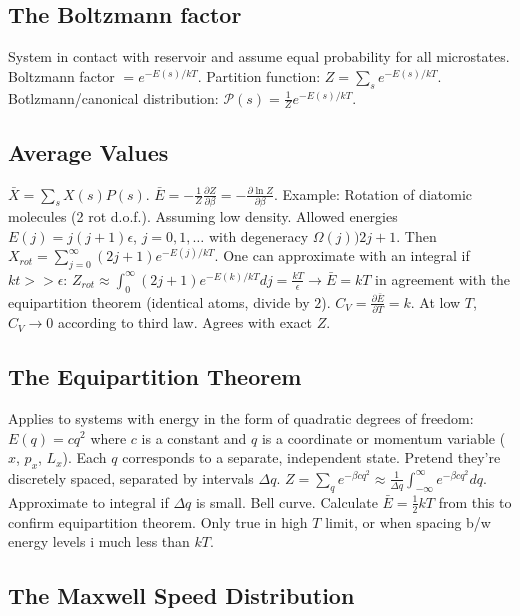 \documentclass[11pt,twocolumn]{amsart}
\begin{document}
\subsection{The Boltzmann factor}
System in contact with reservoir and assume equal probability for all microstates. Boltzmann factor $=e^{-E(s)/kT}$. Partition function: $Z = \sum_s e^{-E(s)/kT}$. Botlzmann/canonical distribution: $\mathcal{P}(s) = \frac{1}{Z}e^{-E(s)/kT}$.

\subsection{Average Values}
$\bar{X} = \sum_s X(s) P(s)$. $\bar{E} = -\frac{1}{Z} \frac{\partial Z}{\partial \beta} = -\frac{\partial \ln Z}{\partial \beta}$. Example: Rotation of diatomic molecules (2 rot d.o.f.). Assuming low density. Allowed energies $E(j) = j(j +1)\epsilon$, $j=0,1,\dots$ with degeneracy $\Omega(j) ) 2j + 1$. Then $X_{rot} = \sum_{j=0}^\infty (2j+1) e^{-E(j)/kT}$. One can approximate with an integral if $kt >> \epsilon$: $Z_{rot} \approx \int_0^\infty (2j+1) e^{-E(k)/kT}dj = \frac{kT}{\epsilon} \rightarrow \bar{E} = kT$ in agreement with the equipartition theorem (identical atoms, divide by $2$). $C_V = \frac{\partial \bar{E}}{\partial T} = k$. At low $T$, $C_V \rightarrow 0$ according to third law. Agrees with exact $Z$. 

\subsection{The Equipartition Theorem}
Applies to systems with energy in the form of quadratic degrees of freedom: $E(q) = cq^2$ where $c$ is a constant and $q$ is a coordinate or momentum variable ($x$, $p_x$, $L_x$). Each $q$ corresponds to a separate, independent state. Pretend they're discretely spaced, separated by intervals $\Delta q$. $Z=\sum_q e^{-\beta cq^2} \approx \frac{1}{\Delta q} \int_{-\infty}^\infty e^{-\beta cq^2} dq$. Approximate to integral if $\Delta q$ is small. Bell curve. Calculate $\bar{E}=\frac{1}{2}kT$ from this to confirm equipartition theorem. Only true in high $T$ limit, or when spacing b/w energy levels i much less than $kT$.

\subsection{The Maxwell Speed Distribution}
\end{document}
